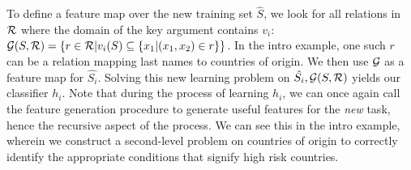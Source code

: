 \documentclass{article}
\theoremstyle{definition}
\begin{document}
To define a feature map over the new training set $\hat{S}$, we look for all relations in $\cal R$ where the domain of the key argument contains $v_i$:
${\cal G}(S,{\cal R}) = \left\{ r \in {\cal R} | v_i(S) \subseteq \{x_1 | (x_1,x_2) \in r\}\right\}$. In the intro example, one such $r$ can be a relation mapping last names to countries of origin. We then use ${\cal G}$ as a feature map for $\hat{S_i}$.
Solving this new learning problem on $\hat{S_i}, {\cal G}(S,{\cal R})$ yields our classifier $h_{i}$.
Note that during the process of learning $h_{i}$, we can once again call the feature generation procedure to generate useful features for the \emph{new} task, hence the recursive aspect of the process. We can see this in the intro example, wherein we construct a second-level problem on countries of origin to correctly identify the appropriate conditions that signify high risk countries.
\end{document}
